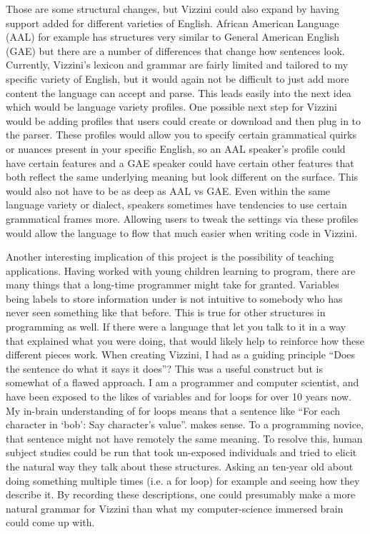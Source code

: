\documentclass[titlepage]{article}
\newcommand{\langName}{Vizzini}
\begin{document}
Those are some structural changes, but \langName{} could also expand by having support added for different varieties of English. African American Language (AAL) for example has structures very similar to General American English (GAE) but there are a number of differences that change how sentences look. Currently, \langName{}'s lexicon and grammar are fairly limited and tailored to my specific variety of English, but it would again not be difficult to just add more content the language can accept and parse. This leads easily into the next idea which would be language variety profiles. One possible next step for \langName{} would be adding profiles that users could create or download and then plug in to the parser. These profiles would allow you to specify certain grammatical quirks or nuances present in your specific English, so an AAL speaker's profile could have certain features and a GAE speaker could have certain other features that both reflect the same underlying meaning but look different on the surface. This would also not have to be as deep as AAL vs GAE. Even within the same language variety or dialect, speakers sometimes have tendencies to use certain grammatical frames more. Allowing users to tweak the settings via these profiles would allow the language to flow that much easier when writing code in \langName{}.

Another interesting implication of this project is the possibility of teaching applications. Having worked with young children learning to program, there are many things that a long-time programmer might take for granted. Variables being labels to store information under is not intuitive to somebody who has never seen something like that before. This is true for other structures in programming as well. If there were a language that let you talk to it in a way that explained what you were doing, that would likely help to reinforce how these different pieces work. When creating \langName{}, I had as a guiding principle ``Does the sentence do what it says it does''? This was a useful construct but is somewhat of a flawed approach. I am a programmer and computer scientist, and have been exposed to the likes of variables and for loops for over 10 years now. My in-brain understanding of for loops means that a sentence like ``For each character in `bob': Say character's value''. makes sense. To a programming novice, that sentence might not have remotely the same meaning. To resolve this, human subject studies could be run that took un-exposed individuals and tried to elicit the natural way they talk about these structures. Asking an ten-year old about doing something multiple times (i.e. a for loop) for example and seeing how they describe it. By recording these descriptions, one could presumably make a more natural grammar for \langName{} than what my computer-science immersed brain could come up with.
\end{document}
